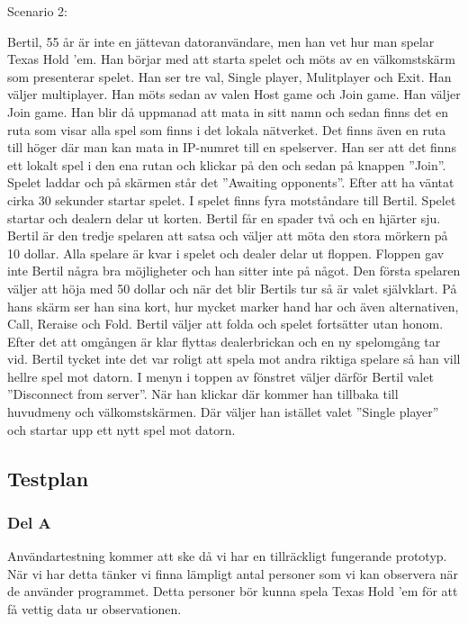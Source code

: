 \documentclass[10pt,a4paper]{article}
\begin{document}
\vspace{1em}
\noindent
Scenario 2:

\vspace{1em}
\noindent
Bertil, 55 år är inte en jättevan datoranvändare, men han vet hur man
spelar Texas Hold ’em. Han börjar med att starta spelet och möts av en
välkomstskärm som presenterar spelet. Han ser tre val, Single player,
Mulitplayer och Exit. Han väljer multiplayer. Han möts sedan av valen Host
game och Join game. Han väljer Join game. Han blir då uppmanad att mata in
sitt namn och sedan finns det en ruta som visar alla spel som finns i det
lokala nätverket. Det finns även en ruta till höger där man kan mata in
IP-numret till en spelserver. Han ser att det finns ett lokalt spel i den
ena rutan och klickar på den och sedan på knappen ”Join”. Spelet laddar och
på skärmen står det ”Awaiting opponents”. Efter att ha väntat cirka 30
sekunder startar spelet. I spelet finns fyra motståndare till Bertil.
Spelet startar och dealern delar ut korten. Bertil får en spader två och en
hjärter sju. Bertil är den tredje spelaren att satsa och väljer att möta
den stora mörkern på 10 dollar. Alla spelare är kvar i spelet och dealer
delar ut floppen. Floppen gav inte Bertil några bra möjligheter och han
sitter inte på något. Den första spelaren väljer att höja med 50 dollar och
när det blir Bertils tur så är valet självklart. På hans skärm ser han sina
kort, hur mycket marker hand har och även alternativen, Call, Reraise och
Fold. Bertil väljer att folda och spelet fortsätter utan honom. Efter det
att omgången är klar flyttas dealerbrickan och en ny spelomgång tar vid.
Bertil tycket inte det var roligt att spela mot andra riktiga spelare så
han vill hellre spel mot datorn. I menyn i toppen av fönstret väljer därför
Bertil valet ”Disconnect from server”. När han klickar där kommer han
tillbaka till huvudmeny och välkomstskärmen. Där väljer han istället valet
”Single player” och startar upp ett nytt spel mot datorn.

\subsection*{Testplan}

\subsubsection*{Del A}

Användartestning kommer att ske då vi har en tillräckligt fungerande
prototyp. När vi har detta tänker vi finna lämpligt antal personer som vi
kan observera när de använder programmet. Detta personer bör kunna spela
Texas Hold 'em för att få vettig data ur observationen.
\end{document}
